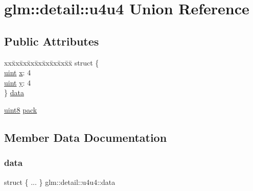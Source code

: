 \hypertarget{unionglm_1_1detail_1_1u4u4}{}\section{glm\+:\+:detail\+:\+:u4u4 Union Reference}
\label{unionglm_1_1detail_1_1u4u4}
\subsection*{Public Attributes}
\begin{DoxyCompactItemize}
\item 
\begin{tabbing}
xx\=xx\=xx\=xx\=xx\=xx\=xx\=xx\=xx\=\kill
struct \{\\
\>\hyperlink{group__core__precision_ga4fd29415871152bfb5abd588334147c8}{uint} \hyperlink{unionglm_1_1detail_1_1u4u4_a488b94e524db2319dd7801ef632ef7f1}{x}: 4\\
\>\hyperlink{group__core__precision_ga4fd29415871152bfb5abd588334147c8}{uint} \hyperlink{unionglm_1_1detail_1_1u4u4_a397ae8c3903b0fd4fe9c88617607f7af}{y}: 4\\
\} \hyperlink{unionglm_1_1detail_1_1u4u4_acb55a563954be88eeb432d3b96720712}{data}\\

\end{tabbing}\item 
\hyperlink{namespaceglm_1_1detail_aef2588f97d090cc19fbbe0c74fe17c8f}{uint8} \hyperlink{unionglm_1_1detail_1_1u4u4_a823a2e3d7ae6e4710c0ceb40e191ef7b}{pack}
\end{DoxyCompactItemize}


\subsection{Member Data Documentation}
\mbox{\label{unionglm_1_1detail_1_1u4u4_acb55a563954be88eeb432d3b96720712}} 
\subsubsection{\texorpdfstring{data}{data}}
{\footnotesize\ttfamily struct \{ ... \}   glm\+::detail\+::u4u4\+::data}

\mbox{\label{unionglm_1_1detail_1_1u4u4_a823a2e3d7ae6e4710c0ceb40e191ef7b}} 
